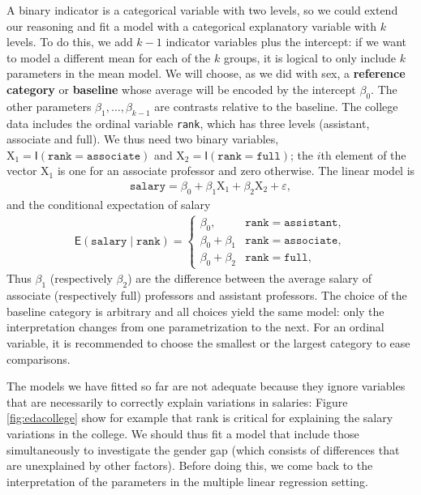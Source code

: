 \documentclass[
  11pt,
  letterpaper,
]{book}
\theoremstyle{definition}
\theoremstyle{definition}
\theoremstyle{definition}
\theoremstyle{remark}
\begin{document}
A binary indicator is a categorical variable with two levels, so we could extend our reasoning and fit a model with a categorical explanatory variable with \(k\) levels. To do this, we add \(k-1\) indicator variables plus the intercept: if we want to model a different mean for each of the \(k\) groups, it is logical to only include \(k\) parameters in the mean model. We will choose, as we did with sex, a \textbf{reference category} or \textbf{baseline} whose average will be encoded by the intercept \(\beta_0\). The other parameters \(\beta_1, \ldots, \beta_{k-1}\) are contrasts relative to the baseline. The college data includes the ordinal variable \texttt{rank}, which has three levels (assistant, associate and full). We thus need two binary variables, \(\mathrm{X}_1 = \mathsf{I}(\texttt{rank}=\texttt{associate})\) and \(\mathrm{X}_2 = \mathsf{I}(\texttt{rank}=\texttt{full})\); the \(i\)th element of the vector \(\mathrm{X}_1\) is one for an associate professor and zero otherwise. The linear model is
\begin{align*}
\texttt{salary} =\beta_0 + \beta_1 \mathrm{X}_1+\beta_2\mathrm{X}_2 + \varepsilon,
\end{align*}
and the conditional expectation of salary
\begin{align*}
\mathsf{E}(\texttt{salary} \mid \texttt{rank})= \begin{cases}
\beta_0, & \texttt{rank}=\texttt{assistant},\\
\beta_0 + \beta_1 & \texttt{rank}=\texttt{associate},\\
\beta_0 + \beta_2 & \texttt{rank}=\texttt{full},
\end{cases}
\end{align*}
Thus \(\beta_1\) (respectively \(\beta_2\)) are the difference between the average salary of associate (respectively full) professors and assistant professors. The choice of the baseline category is arbitrary and all choices yield the same model: only the interpretation changes from one parametrization to the next. For an ordinal variable, it is recommended to choose the smallest or the largest category to ease comparisons.

The models we have fitted so far are not adequate because they ignore variables that are necessarily to correctly explain variations in salaries: Figure \ref{fig:edacollege} show for example that rank is critical for explaining the salary variations in the college. We should thus fit a model that include those simultaneously to investigate the gender gap (which consists of differences that are unexplained by other factors). Before doing this, we come back to the interpretation of the parameters in the multiple linear regression setting.
\end{document}
